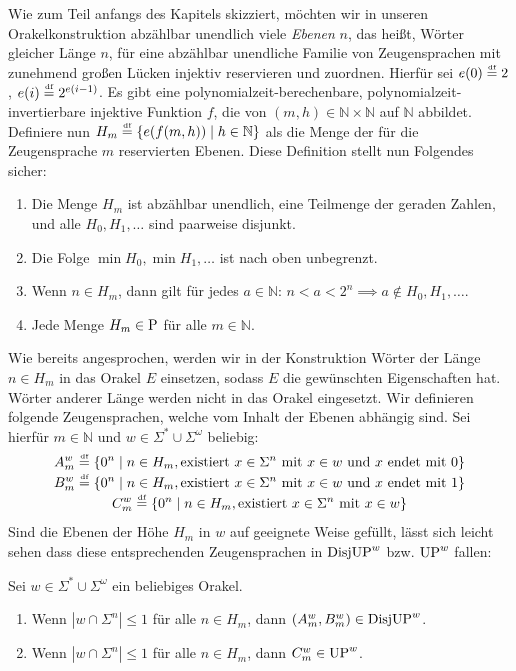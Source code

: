 Wie zum Teil anfangs des Kapitels skizziert, möchten wir in unseren Orakelkonstruktion abzählbar unendlich viele \emph{Ebenen} $n$, das heißt, Wörter gleicher Länge $n$, für eine abzählbar unendliche Familie von Zeugensprachen mit zunehmend großen Lücken injektiv reservieren und zuordnen.
Hierfür sei $e(0) \defeq 2$, $e(i) \defeq 2^{e(i-1)}$.
Es gibt eine polynomialzeit-berechenbare, polynomialzeit-invertierbare injektive Funktion $f$, die von $(m,h)\in\mathbb N\times\mathbb N$ auf $\mathbb N$ abbildet.
Definiere nun $H_m \defeq \{ e(f(m,h)) \mid h\in\mathbb N \}$ als die Menge der für die Zeugensprache $m$ reservierten Ebenen.
Diese Definition stellt nun Folgendes sicher:
\begin{observation}\label{obs:leveldefinitions}
    \begin{enumerate}
        \item Die Menge $H_m$ ist abzählbar unendlich, eine Teilmenge der geraden Zahlen, und alle $H_0, H_1, \dots$ sind paarweise disjunkt.
        \item Die Folge $\min H_0, \min H_1, \dots$ ist nach oben unbegrenzt.
        \item Wenn $n\in H_m$, dann gilt für jedes $a\in\mathbb N$: $n<a<2^{n} \implies a\not\in H_0, H_1, \dots$.
        \item Jede Menge $H_m\in \P$ für alle $m\in\mathbb N$.
    \end{enumerate}
\end{observation}


Wie bereits angesprochen, werden wir in der Konstruktion Wörter der Länge $n\in H_m$ in das Orakel $E$ einsetzen, sodass $E$ die gewünschten Eigenschaften hat.
Wörter anderer Länge werden nicht in das Orakel eingesetzt.
Wir definieren folgende Zeugensprachen, welche vom Inhalt der Ebenen abhängig sind. Sei hierfür $m\in\mathbb N$ und $w\in\Sigma^*\cup\Sigma^{\omega}$ beliebig:
\begin{gather*}
    A_m^w \defeq \{ 0^n \mid n\in H_m, \text{existiert $x\in \Sigma^{n}$ mit } x\in w \text{ und $x$ endet mit $0$} \}\\
    B_m^w \defeq \{ 0^n \mid n\in H_m, \text{existiert $x\in \Sigma^{n}$ mit } x\in w \text{ und $x$ endet mit $1$} \}\\
    C_m^w \defeq \{ 0^n \mid n\in H_m, \text{existiert $x\in \Sigma^{n}$ mit } x\in w  \}
\end{gather*}
Sind die Ebenen der Höhe $H_m$ in $w$ auf geeignete Weise gefüllt, lässt sich leicht sehen dass diese entsprechenden Zeugensprachen in $\DisjUP^w$ bzw. $\UP^w$ fallen:
\begin{claim}\label{claim:witnesslanguages}
    Sei $w\in\Sigma^*\cup\Sigma^\omega$ ein beliebiges Orakel.
    \begin{enumerate}
        \item Wenn $|w\cap \Sigma^{n}|\leq 1$ für alle $n\in H_m$, dann $(A_m^w, B_m^w)\in\DisjUP^w$.
        \item Wenn $|w\cap \Sigma^n|\leq 1$ für alle $n\in H_m$, dann $C_m^w \in \UP^w$.
    \end{enumerate}
\end{claim}


